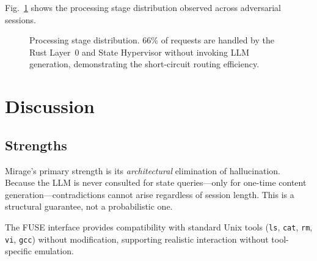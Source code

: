 \documentclass[conference]{IEEEtran}
\begin{document}
Fig.~\ref{fig:processing} shows the processing stage distribution observed across adversarial sessions.

\begin{figure}[htbp]
\centering
{}
\caption{Processing stage distribution. 66\% of requests are handled by the Rust Layer~0 and State Hypervisor without invoking LLM generation, demonstrating the short-circuit routing efficiency.}
\label{fig:processing}
\end{figure}

\section{Discussion}
\label{sec:discussion}

\subsection{Strengths}

Mirage's primary strength is its \emph{architectural} elimination of hallucination.
Because the LLM is never consulted for state queries---only for one-time content generation---contradictions cannot arise regardless of session length.
This is a structural guarantee, not a probabilistic one.

The FUSE interface provides compatibility with standard Unix tools (\texttt{ls}, \texttt{cat}, \texttt{rm}, \texttt{vi}, \texttt{gcc}) without modification, supporting realistic interaction without tool-specific emulation.
\end{document}
